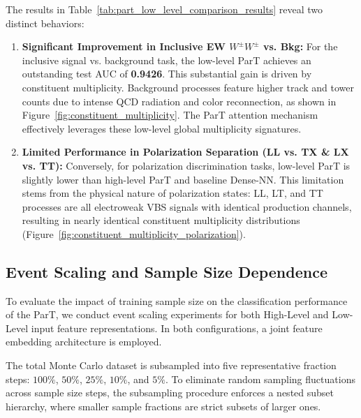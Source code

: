 \documentclass[12pt]{article}
\begin{document}
			The results in Table~\ref{tab:part_low_level_comparison_results} reveal two distinct behaviors:
			\begin{enumerate}
				\item \textbf{Significant Improvement in Inclusive EW $W^\pm W^\pm$ vs. Bkg:} For the inclusive signal vs. background task, the low-level ParT achieves an outstanding test AUC of \textbf{0.9426}. This substantial gain is driven by constituent multiplicity. Background processes feature higher track and tower counts due to intense QCD radiation and color reconnection, as shown in Figure~\ref{fig:constituent_multiplicity}. The ParT attention mechanism effectively leverages these low-level global multiplicity signatures.

				\item \textbf{Limited Performance in Polarization Separation (LL vs. TX \& LX vs. TT):} Conversely, for polarization discrimination tasks, low-level ParT is slightly lower than high-level ParT and baseline Dense-NN. This limitation stems from the physical nature of polarization states: LL, LT, and TT processes are all electroweak VBS signals with identical production channels, resulting in nearly identical constituent multiplicity distributions (Figure~\ref{fig:constituent_multiplicity_polarization}).
            \end{enumerate}



	\subsection{Event Scaling and Sample Size Dependence}%
	\label{sub:event_scaling_and_sample_size_dependence}

		To evaluate the impact of training sample size on the classification performance of the ParT, we conduct event scaling experiments for both High-Level and Low-Level input feature representations. In both configurations, a joint feature embedding architecture is employed.

		The total Monte Carlo dataset is subsampled into five representative fraction steps: $100\%$, $50\%$, $25\%$, $10\%$, and $5\%$. To eliminate random sampling fluctuations across sample size steps, the subsampling procedure enforces a nested subset hierarchy, where smaller sample fractions are strict subsets of larger ones.
\end{document}
